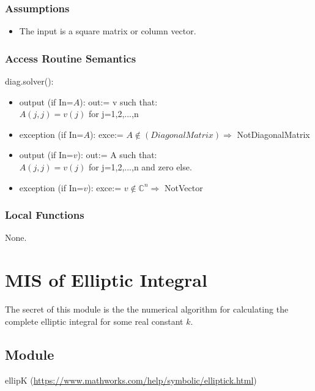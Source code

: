 \documentclass[12pt, titlepage]{article}
\begin{document}
\subsubsection{Assumptions}

\begin{itemize}
	\item The input is a square matrix or column vector.  
\end{itemize}

\subsubsection{Access Routine Semantics}

\noindent diag.solver():
\begin{itemize}
	\item output (if In=$A$): out:= v such that:\\
	$A(j,j) = v(j)$ for j=1,2,...,n \\
	\item exception (if In=$A$): exce:= $A \not\in (Diagonal Matrix) 
	\Rightarrow$ 
	NotDiagonalMatrix 
	\item output (if In=$v$): out:= A such that:\\
	$A(j,j) = v(j)$ for j=1,2,...,n and zero else. \\
	\item exception (if In=$v$): exce:= $v \not\in \mathbb{C}^{n} \Rightarrow$ 
	NotVector 
\end{itemize} 

\subsubsection{Local Functions} 

None. 

\newpage 

\section{MIS of Elliptic Integral} \label{MEI}

The secret of this module is the the numerical algorithm for calculating the 
complete 
elliptic integral for some real constant $k$.

\subsection{Module}

ellipK (\url{https://www.mathworks.com/help/symbolic/elliptick.html})
\end{document}
